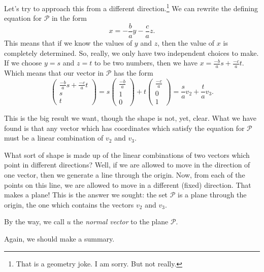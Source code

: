 \documentclass[00-livre-main.tex]{subfiles}
\begin{document}
Let's try to approach this from a different direction.\footnote{That is a geometry joke. I am sorry. But not really.} We can rewrite the defining equation for $\mathcal{P}$ in 
the form
\[
x = -\frac{b}{a}y -\frac{c}{a}z.
\]
This means that if we know the values of $y$ and $z$, then the value of $x$ is completely determined. So, really, we only have two independent choices to make. If we choose $y=s$ and $z=t$ to be two numbers, then we have $x = \frac{-b}{a} s + \frac{-c}{a} t$. Which means that our vector in $\mathcal{P}$ has the form
\[
\begin{pmatrix} \frac{-b}{a} s + \frac{-c}{a} t \\ s \\ t \end{pmatrix} 
= s\begin{pmatrix}  \frac{-b}{a} \\1 \\ 0 \end{pmatrix} 
+ t\begin{pmatrix} \frac{-c}{a} \\ 0 \\ 1 \end{pmatrix} = \frac{s}{a} v_2 + \frac{t}{a} v_3.
\]

This is the big result we want, though the shape is not, yet, clear. What we have found is that any vector which has coordinates which satisfy the equation for $\mathcal{P}$ must be a linear combination of $v_2$ and $v_3$. 

What sort of shape is made up of the linear combinations of two vectors which point in different directions? Well, if we are allowed to move in the direction of one vector, then we generate a line through the origin. Now, from each of the points on this line, we are allowed to move in a different (fixed) direction. That makes a plane! This is the answer we sought: the set $\mathcal{P}$ is a plane through the origin, the one which contains the vectors $v_2$ and $v_3$. 

By the way, we call $u$ the \emph{normal vector} to the plane $\mathcal{P}$.

Again, we should make a summary.
\end{document}
